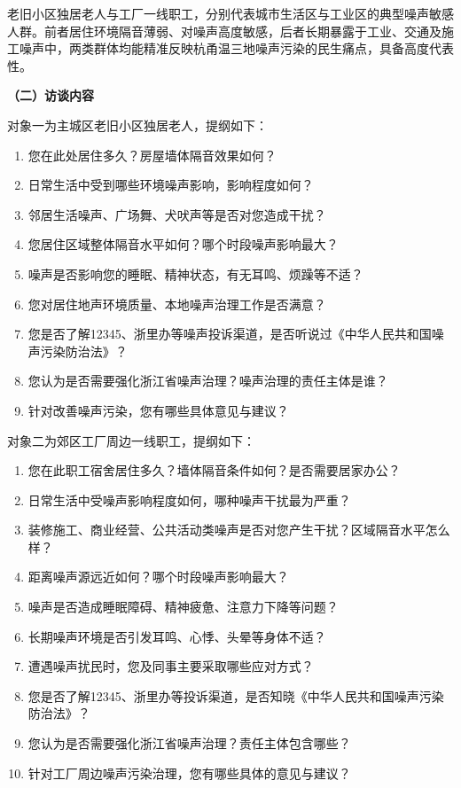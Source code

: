 老旧小区独居老人与工厂一线职工，分别代表城市生活区与工业区的典型噪声敏感人群。前者居住环境隔音薄弱、对噪声高度敏感，后者长期暴露于工业、交通及施工噪声中，两类群体均能精准反映杭甬温三地噪声污染的民生痛点，具备高度代表性。

\textbf{（二）访谈内容}

对象一为主城区老旧小区独居老人，提纲如下：

\begin{enumerate}[label=（\arabic*）,leftmargin=2.5em,itemsep=0.5ex]
\item 您在此处居住多久？房屋墙体隔音效果如何？
\item 日常生活中受到哪些环境噪声影响，影响程度如何？
\item 邻居生活噪声、广场舞、犬吠声等是否对您造成干扰？
\item 您居住区域整体隔音水平如何？哪个时段噪声影响最大？
\item 噪声是否影响您的睡眠、精神状态，有无耳鸣、烦躁等不适？
\item 您对居住地声环境质量、本地噪声治理工作是否满意？
\item 您是否了解12345、浙里办等噪声投诉渠道，是否听说过《中华人民共和国噪声污染防治法》？
\item 您认为是否需要强化浙江省噪声治理？噪声治理的责任主体是谁？
\item 针对改善噪声污染，您有哪些具体意见与建议？
\end{enumerate}

对象二为郊区工厂周边一线职工，提纲如下：

\begin{enumerate}[label=（\arabic*）,leftmargin=2.5em,itemsep=0.5ex]
\item 您在此职工宿舍居住多久？墙体隔音条件如何？是否需要居家办公？
\item 日常生活中受噪声影响程度如何，哪种噪声干扰最为严重？
\item 装修施工、商业经营、公共活动类噪声是否对您产生干扰？区域隔音水平怎么样？
\item 距离噪声源远近如何？哪个时段噪声影响最大？
\item 噪声是否造成睡眠障碍、精神疲惫、注意力下降等问题？
\item 长期噪声环境是否引发耳鸣、心悸、头晕等身体不适？
\item 遭遇噪声扰民时，您及同事主要采取哪些应对方式？
\item 您是否了解12345、浙里办等投诉渠道，是否知晓《中华人民共和国噪声污染防治法》？
\item 您认为是否需要强化浙江省噪声治理？责任主体包含哪些？
\item 针对工厂周边噪声污染治理，您有哪些具体的意见与建议？
\end{enumerate}

